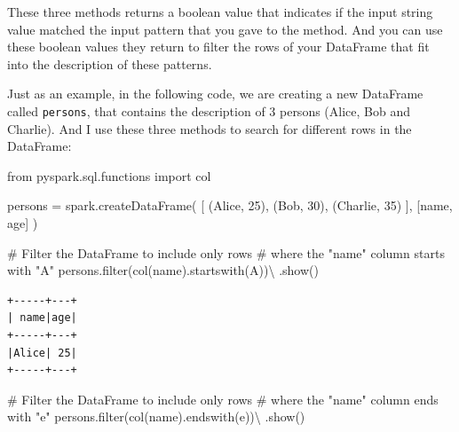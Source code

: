 \documentclass[
  11pt,
  letterpaper,
  DIV=11,
  numbers=noendperiod]{scrreprt}
\newenvironment{Shaded}{\begin{snugshade}}{\end{snugshade}}
\newcommand{\BuiltInTok}[1]{\textcolor[rgb]{0.00,0.23,0.31}{#1}}
\newcommand{\CommentTok}[1]{\textcolor[rgb]{0.37,0.37,0.37}{#1}}
\newcommand{\DecValTok}[1]{\textcolor[rgb]{0.68,0.00,0.00}{#1}}
\newcommand{\ImportTok}[1]{\textcolor[rgb]{0.00,0.46,0.62}{#1}}
\newcommand{\NormalTok}[1]{\textcolor[rgb]{0.00,0.23,0.31}{#1}}
\newcommand{\OperatorTok}[1]{\textcolor[rgb]{0.37,0.37,0.37}{#1}}
\newcommand{\StringTok}[1]{\textcolor[rgb]{0.13,0.47,0.30}{#1}}
\begin{document}
These three methods returns a boolean value that indicates if the input
string value matched the input pattern that you gave to the method. And
you can use these boolean values they return to filter the rows of your
DataFrame that fit into the description of these patterns.

Just as an example, in the following code, we are creating a new
DataFrame called \texttt{persons}, that contains the description of 3
persons (Alice, Bob and Charlie). And I use these three methods to
search for different rows in the DataFrame:

\begin{Shaded}
\begin{Highlighting}[]
\ImportTok{from}\NormalTok{ pyspark.sql.functions }\ImportTok{import}\NormalTok{ col}

\NormalTok{persons }\OperatorTok{=}\NormalTok{ spark.createDataFrame(}
\NormalTok{  [}
\NormalTok{    (}\StringTok{\textquotesingle{}Alice\textquotesingle{}}\NormalTok{, }\DecValTok{25}\NormalTok{),}
\NormalTok{    (}\StringTok{\textquotesingle{}Bob\textquotesingle{}}\NormalTok{, }\DecValTok{30}\NormalTok{),}
\NormalTok{    (}\StringTok{\textquotesingle{}Charlie\textquotesingle{}}\NormalTok{, }\DecValTok{35}\NormalTok{)}
\NormalTok{  ],}
\NormalTok{  [}\StringTok{\textquotesingle{}name\textquotesingle{}}\NormalTok{, }\StringTok{\textquotesingle{}age\textquotesingle{}}\NormalTok{]}
\NormalTok{)}

\CommentTok{\# Filter the DataFrame to include only rows}
\CommentTok{\# where the "name" column starts with "A"}
\NormalTok{persons.}\BuiltInTok{filter}\NormalTok{(col(}\StringTok{\textquotesingle{}name\textquotesingle{}}\NormalTok{).startswith(}\StringTok{\textquotesingle{}A\textquotesingle{}}\NormalTok{))}\OperatorTok{\textbackslash{}}
\NormalTok{  .show()}
\end{Highlighting}
\end{Shaded}

\begin{verbatim}
+-----+---+
| name|age|
+-----+---+
|Alice| 25|
+-----+---+
\end{verbatim}

\begin{Shaded}
\begin{Highlighting}[]
\CommentTok{\# Filter the DataFrame to include only rows}
\CommentTok{\# where the "name" column ends with "e"}
\NormalTok{persons.}\BuiltInTok{filter}\NormalTok{(col(}\StringTok{\textquotesingle{}name\textquotesingle{}}\NormalTok{).endswith(}\StringTok{\textquotesingle{}e\textquotesingle{}}\NormalTok{))}\OperatorTok{\textbackslash{}}
\NormalTok{  .show()}
\end{Highlighting}
\end{Shaded}
\end{document}
